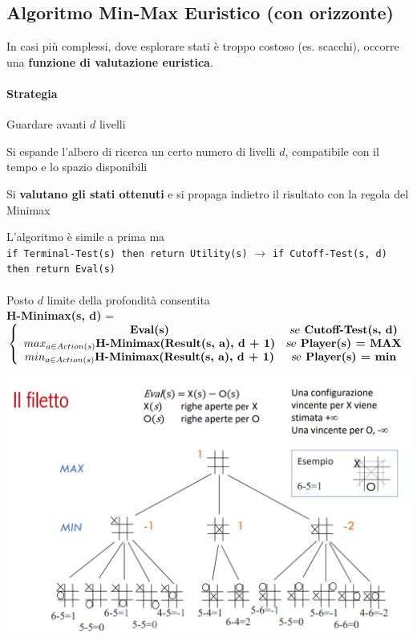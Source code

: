 \documentclass[10pt]{book}
\begin{document}
\subsection{Algoritmo Min-Max Euristico (con orizzonte)}
In casi più complessi, dove esplorare stati è troppo costoso (es. scacchi), occorre una \textbf{funzione di valutazione euristica}.
\paragraph{Strategia} Guardare avanti $d$ livelli
\begin{list}{}{}
	\item Si espande l'albero di ricerca un certo numero di livelli $d$, compatibile con il tempo e lo spazio disponibili
	\item Si \textbf{valutano gli stati ottenuti} e si propaga indietro il risultato con la regola del Minimax
\end{list}
L'algoritmo è simile a prima ma\\
\texttt{if Terminal-Test(s) then return Utility(s)} $\rightarrow$ \texttt{if Cutoff-Test(s, d) then return Eval(s)}\\\\
Posto $d$ limite della profondità consentita\\
\textbf{H-Minimax(s, d)} = 
\begin{math}
\left\{
\begin{array}{c c}
	\textbf{Eval(s)} & \textsl{se}\:\:\textbf{Cutoff-Test(s, d)}\\
	max_{a \in Action(s)} \textbf{H-Minimax(Result(s, a), d + 1)} & \textsl{se}\:\: \textbf{Player(s) = MAX}\\
	min_{a \in Action(s)} \textbf{H-Minimax(Result(s, a), d + 1)} & \textsl{se}\:\: \textbf{Player(s) = min}
\end{array}
\right.
\end{math}
\begin{center}
	\includegraphics[scale=0.5]{hminmax_tictactoe.png}
\end{center}
\end{document}
